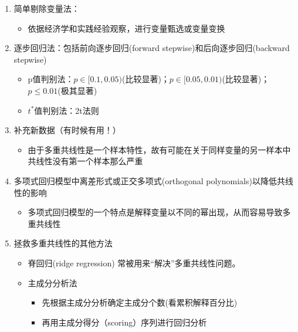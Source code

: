 \documentclass[12pt,(landscape,a4paper),(portrait,a4paper)]{article}
\providecommand{\tightlist}{%
  \setlength{\itemsep}{0pt}\setlength{\parskip}{0pt}}
\begin{document}
\begin{enumerate}
\def\labelenumi{\alph{enumi}.}
\tightlist
\item
  简单剔除变量法：

  \begin{itemize}
  \tightlist
  \item
    依据经济学和实践经验观察，进行变量甄选或变量变换
  \end{itemize}
\item
  逐步回归法：包括前向逐步回归(forward stepwise)和后向逐步回归(backward
  stepwise)

  \begin{itemize}
  \tightlist
  \item
    p值判别法：\(p\in[0.1,0.05)\)(比较显著)；\(p\in[0.05,0.01)\)(比较显著)；\(p\leq 0.01\)(极其显著)
  \item
    \(t^{\ast}\)值判别法：2t法则
  \end{itemize}
\item
  补充新数据（有时候有用！）

  \begin{itemize}
  \tightlist
  \item
    由于多重共线性是一个样本特性，故有可能在关于同样变量的另一样本中共线性没有第一个样本那么严重
  \end{itemize}
\item
  多项式回归模型中离差形式或正交多项式(orthogonal
  polynomials)以降低共线性的影响

  \begin{itemize}
  \tightlist
  \item
    多项式回归模型的一个特点是解释变量以不同的幂出现，从而容易导致多重共线性
  \end{itemize}
\item
  拯救多重共线性的其他方法

  \begin{itemize}
  \tightlist
  \item
    脊回归(ridge regression) 常被用来``解决''多重共线性问题。
  \item
    主成分分析法

    \begin{itemize}
    \tightlist
    \item
      先根据主成分分析确定主成分个数(看累积解释百分比)
    \item
      再用主成分得分（scoring）序列进行回归分析
    \end{itemize}
  \end{itemize}
\end{enumerate}
\end{document}
